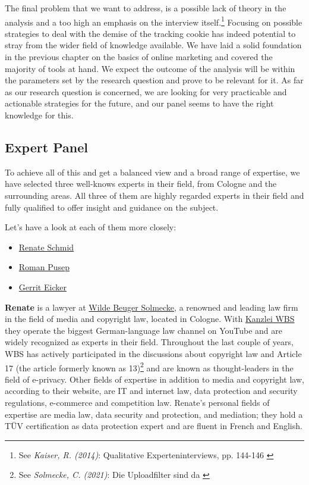 The final problem that we want to address, is a possible lack of theory in the analysis and a too high an emphasis on the interview itself.\footnote{See \textit{Kaiser, R. (2014)}: Qualitative Experteninterviews, pp. 144-146 \cite{expertInterviews}} Focusing on possible strategies to deal with the demise of the tracking cookie has indeed potential to stray from the wider field of knowledge available. We have laid a solid foundation in the previous chapter on the basics of online marketing and covered the majority of tools at hand. We expect the outcome of the analysis will be within the parameters set by the research question and prove to be relevant for it. As far as our research question is concerned, we are looking for very practicable and actionable strategies for the future, and our panel seems to have the right knowledge for this.

\subsection{Expert Panel}

To achieve all of this and get a balanced view and a broad range of expertise, we have selected three well-knows experts in their field, from Cologne and the surrounding areas. All three of them are highly regarded experts in their field and fully qualified to offer insight and guidance on the subject.

Let's have a look at each of them more closely:

\begin{itemize}
 \item \href{https://www.linkedin.com/in/renate-schmid-535233113/}{Renate Schmid}
 \item \href{https://www.linkedin.com/in/roman-pusep-36b33374/}{Roman Pusep}
 \item \href{https://www.linkedin.com/in/eicker/}{Gerrit Eicker}
\end{itemize}

\textbf{Renate} is a lawyer at \href{https://www.wbs-law.de/}{Wilde Beuger Solmecke}, a renowned and leading law firm in the field of media and copyright law, located in Cologne. With \href{https://www.youtube.com/user/KanzleiWBS}{Kanzlei WBS} they operate the biggest German-language law channel on YouTube and are widely recognized as experts in their field. Throughout the last couple of years, WBS has actively participated in the discussions about copyright law and Article 17 (the article formerly known as 13)\footnote{See \textit{Solmecke, C. (2021)}: Die Uploadfilter sind da \cite{article17}} and are known as thought-leaders in the field of e-privacy. Other fields of expertise in addition to media and copyright law, according to their website, are IT and internet law, data protection and security regulations, e-commerce and competition law. Renate's personal fields of expertise are media law, data security and protection, and mediation; they hold a TÜV certification as data protection expert and are fluent in French and English.


